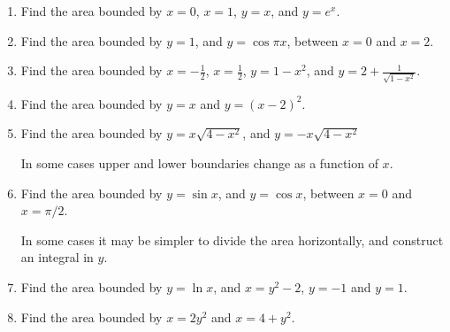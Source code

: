 \documentclass[11pt]{article}
\begin{document}
    \begin{enumerate}

    \item{Find the area bounded by $x=0$, $x=1$,  $y=x$, and $y=e^x$.}

      \vspace{2.7in}

      \item{Find the area bounded by $y=1$, and $y=\cos{\pi x}$, between $x=0$ and $x=2$.}

        \pagebreak


            \item{Find the area bounded by $x=-\frac12$, $x=\frac12$,  $y=1-x^2$, and $y=2 + \frac{1}{\sqrt{1-x^2}}$.}

              \vspace{2.7in}

            \item{Find the area bounded by $y=x$ and $y=(x-2)^2$.}
              
              \vspace{2.7in}
              
      \item{Find the area bounded by $y=x\sqrt{4-x^2}$, and $y=-x\sqrt{4-x^2}$}


        \pagebreak

        In some cases upper and lower boundaries change as a function of $x$.

        \vspace{2.5in}


              \item{Find the area bounded by $y=\sin{x}$, and $y=\cos{x}$, between $x=0$ and $x=\pi/2$.}
              

      


    \pagebreak
    
In some cases it may be simpler to divide the area horizontally, and construct an integral in $y$.\\

\vspace{0.1in}
              \item{Find the area bounded by $y=\ln{x}$, and $x=y^2-2$, $y=-1$ and $y=1$.}

\vspace{3in}

              \item{Find the area bounded by $x=2y^2$ and $x=4+y^2$.}

    \end{enumerate}                      

    \pagebreak
\end{document}

